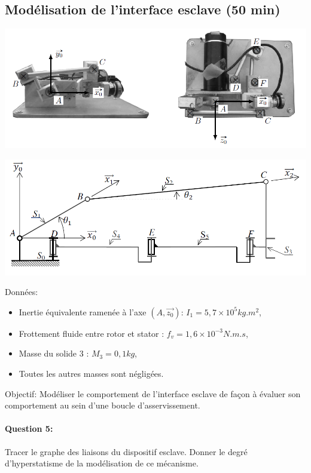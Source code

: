 \subsection{Modélisation de l'interface esclave (50 min)}

\begin{center}
 \includegraphics[width=0.9\linewidth]{img/Figure10}
\end{center}

\begin{center}
 \includegraphics[width=0.9\linewidth]{img/Figure11}
\end{center}

Données:
\begin{itemize}
 \item Inertie	équivalente	ramenée	à l'axe $(A,\overrightarrow{z_0})$: $I_1=5,7\times 10^{5}kg.m^2$,
 \item Frottement fluide entre rotor et stator : $f_v = 1,6\times 10^{-3} N.m.s$,
 \item Masse du solide 3 : $M_3=0,1kg$,
 \item Toutes les autres masses sont négligées.
\end{itemize}

Objectif: Modéliser le comportement de l'interface esclave de façon à évaluer son comportement au sein d'une boucle d'asservissement.

\paragraph{Question 5:} Tracer le graphe des liaisons du dispositif esclave. Donner le degré d'hyperstatisme de la modélisation de ce mécanisme.

